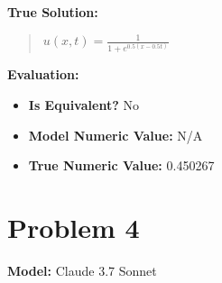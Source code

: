 \documentclass{article}
\begin{document}
\textbf{True Solution:}
\begin{quote}
$u(x, t) = \frac{1}{1 + e^{0.5(x - 0.5 t)}}$
\end{quote}

\textbf{Evaluation:}
\begin{itemize}
\item \textbf{Is Equivalent?} No
\item \textbf{Model Numeric Value:} N/A
\item \textbf{True Numeric Value:} 0.450267
\end{itemize}
\vspace{1cm}
\section*{Problem 4}
\textbf{Model:} Claude 3.7 Sonnet
\end{document}
